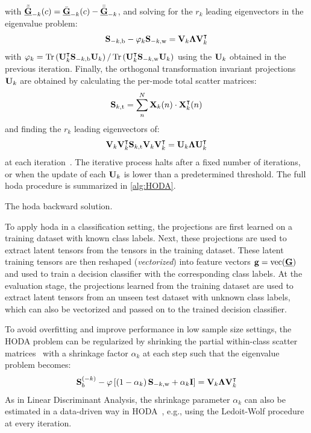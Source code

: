 \documentclass[10pt]{iopart}
\begin{document}
with $\tilde{\bar{\underline{\mathbf{G}}}}_{-k}(c) = \bar{\underline{\mathbf{G}}}_{-k}(c) - \bar{\bar{\underline{\mathbf{G}}}}_{-k}$,
and solving for the $r_k$ leading eigenvectors in the eigenvalue problem:
\begin{equation}
	\mathbf{S}_{-k,\text{b}}-\varphi_k\mathbf{S}_{-k,\text{w}} =
	\mathbf{V}_k\mathbf{\Lambda}\mathbf{V}_k^\intercal
\end{equation}
with $\varphi_k=\mathop{\mathrm{Tr}}\nolimits\left(\mathbf{U}_k^\intercal\mathbf{S}_{-k,\text{b}}\mathbf{U}_k\right)/\mathop{\mathrm{Tr}}\nolimits\left(\mathbf{U}_k^\intercal\mathbf{S}_{-k,\text{w}}\mathbf{U}_k\right)$
using the $\mathbf{U}_k$ obtained in the previous iteration.
Finally, the orthogonal transformation invariant projections $\mathbf{U}_k$
are obtained by calculating the
per-mode total scatter matrices:
\begin{equation}
  \mathbf{S}_{k,\text{t}} = \sum_n^N\mathbf{X}_k(n)\cdot\mathbf{X}_k^\intercal(n)
\end{equation}
and finding the $r_k$ leading eigenvectors of:
\begin{equation}
	\mathbf{V}_k\mathbf{V}_k^\intercal\mathbf{S}_{k,\text{t}}\mathbf{V}_k\mathbf{V}_k^\intercal
	= \mathbf{U}_k\mathbf{\Lambda}\mathbf{U}_k^\intercal
\end{equation}
at each iteration~\cite{Wang2007}.
The iterative process halts after a fixed number of iterations, or when the
update of each $\mathbf{U}_k$ is lower than a predetermined threshold.
The full \ac{hoda} procedure is summarized in \cref{alg:HODA}.
\begin{algorithm}
  \caption[A \acs{hoda} backward solution.]{The \acs{hoda} backward solution.}
	\label{alg:HODA}
	
\end{algorithm}

To apply \ac{hoda} in a classification setting, the projections
are first learned on a training dataset with known class labels.
Next, these projections are used to extract latent tensors from the
tensors in the training dataset.
These latent training tensors are then reshaped (\emph{vectorized}) into feature vectors
$\mathbf{g} =  \mathop{\mathrm{vec}}(\underline{\mathbf{G}})$ and used to train a decision classifier with the corresponding class labels.
At the evaluation stage, the projections learned from the training dataset are
used to extract latent tensors from an unseen test dataset with unknown class
labels, which can also be vectorized and passed on to the trained decision
classifier.

To avoid overfitting and improve performance in low sample size settings, the
HODA problem can be regularized by shrinking the partial
within-class scatter matrices~\cite{Phan2010} with a shrinkage factor
$\alpha_k$ at each step such that the eigenvalue problem becomes:
\begin{equation}
	\mathbf{S}_b^{(-k)} -
	\varphi\left[\left(1-\alpha_k\right)\mathbf{S}_{-k,\text{w}}+\alpha_k\mathbf{I}\right] =
	\mathbf{V}_k\mathbf{\Lambda}\mathbf{V}_k^\intercal
\end{equation}
As in Linear Discriminant Analysis, the shrinkage parameter $\alpha_k$ can
also be estimated in a data-driven way in HODA~\cite{Jorajuria2022},
e.g., using the Ledoit-Wolf procedure~\cite{Ledoit2003} at every iteration.
\end{document}
